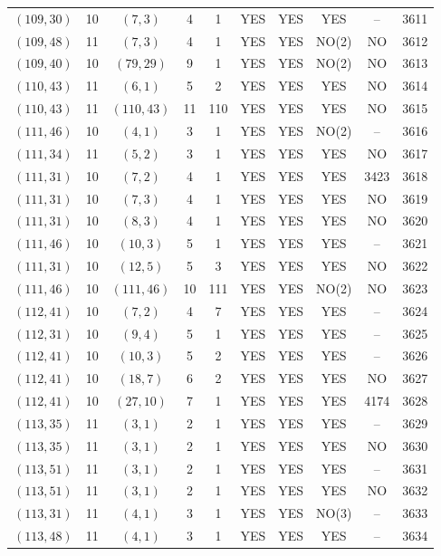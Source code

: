 \begin{longtable}{|c|c|c|c|c|c|c|c|c|c|}
$(109, 30)$ & 10 & $(7, 3)$ & 4 & 1 & YES & YES & YES & -- & 3611\\
$(109, 48)$ & 11 & $(7, 3)$ & 4 & 1 & YES & YES & NO(2) & NO & 3612\\
$(109, 40)$ & 10 & $(79, 29)$ & 9 & 1 & YES & YES & NO(2) & NO & 3613\\
$(110, 43)$ & 11 & $(6, 1)$ & 5 & 2 & YES & YES & YES & NO & 3614\\
$(110, 43)$ & 11 & $(110, 43)$ & 11 & 110 & YES & YES & YES & NO & 3615\\
$(111, 46)$ & 10 & $(4, 1)$ & 3 & 1 & YES & YES & NO(2) & -- & 3616\\
$(111, 34)$ & 11 & $(5, 2)$ & 3 & 1 & YES & YES & YES & NO & 3617\\
$(111, 31)$ & 10 & $(7, 2)$ & 4 & 1 & YES & YES & YES & 3423 & 3618\\
$(111, 31)$ & 10 & $(7, 3)$ & 4 & 1 & YES & YES & YES & NO & 3619\\
$(111, 31)$ & 10 & $(8, 3)$ & 4 & 1 & YES & YES & YES & NO & 3620\\
$(111, 46)$ & 10 & $(10, 3)$ & 5 & 1 & YES & YES & YES & -- & 3621\\
$(111, 31)$ & 10 & $(12, 5)$ & 5 & 3 & YES & YES & YES & NO & 3622\\
$(111, 46)$ & 10 & $(111, 46)$ & 10 & 111 & YES & YES & NO(2) & NO & 3623\\
$(112, 41)$ & 10 & $(7, 2)$ & 4 & 7 & YES & YES & YES & -- & 3624\\
$(112, 31)$ & 10 & $(9, 4)$ & 5 & 1 & YES & YES & YES & -- & 3625\\
$(112, 41)$ & 10 & $(10, 3)$ & 5 & 2 & YES & YES & YES & -- & 3626\\
$(112, 41)$ & 10 & $(18, 7)$ & 6 & 2 & YES & YES & YES & NO & 3627\\
$(112, 41)$ & 10 & $(27, 10)$ & 7 & 1 & YES & YES & YES & 4174 & 3628\\
$(113, 35)$ & 11 & $(3, 1)$ & 2 & 1 & YES & YES & YES & -- & 3629\\
$(113, 35)$ & 11 & $(3, 1)$ & 2 & 1 & YES & YES & YES & NO & 3630\\
$(113, 51)$ & 11 & $(3, 1)$ & 2 & 1 & YES & YES & YES & -- & 3631\\
$(113, 51)$ & 11 & $(3, 1)$ & 2 & 1 & YES & YES & YES & NO & 3632\\
$(113, 31)$ & 11 & $(4, 1)$ & 3 & 1 & YES & YES & NO(3) & -- & 3633\\
$(113, 48)$ & 11 & $(4, 1)$ & 3 & 1 & YES & YES & YES & -- & 3634\\

\end{longtable}
